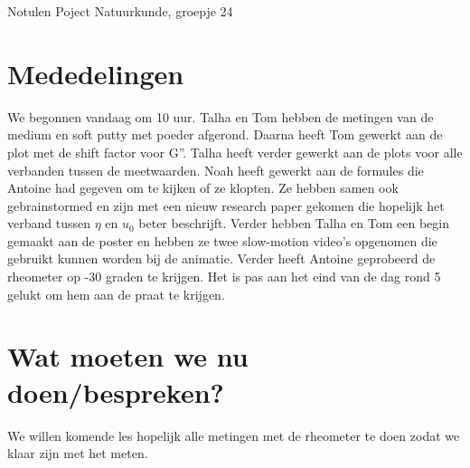\documentclass[11pt,a4paper]{article}
\begin{document}
\begin{Minutes}{Notulen Poject Natuurkunde, groepje 24}


\endtime{}
\location{}




\maketitle



\newpage


\section{Mededelingen} 
We begonnen vandaag om 10 uur. Talha en Tom hebben de metingen van de medium en soft putty met poeder afgerond. Daarna heeft Tom gewerkt aan de plot met de shift factor voor G''. Talha heeft verder gewerkt aan de plots voor alle verbanden tussen de meetwaarden. Noah heeft gewerkt aan de formules die Antoine had gegeven om te kijken of ze klopten. Ze hebben samen ook gebrainstormed en zijn met een nieuw research paper gekomen die hopelijk het verband tussen $\eta$ en $u_0$ beter beschrijft. Verder hebben Talha en Tom een begin gemaakt aan de poster en hebben ze twee slow-motion video's opgenomen die gebruikt kunnen worden bij de animatie. Verder heeft Antoine geprobeerd de rheometer op -30 graden te krijgen. Het is pas aan het eind van de dag rond 5 gelukt om hem aan de praat te krijgen.

\section{Wat moeten we nu doen/bespreken?}
We willen komende les hopelijk alle metingen met de rheometer te doen zodat we klaar zijn met het meten.


\end{Minutes}
\end{document}
